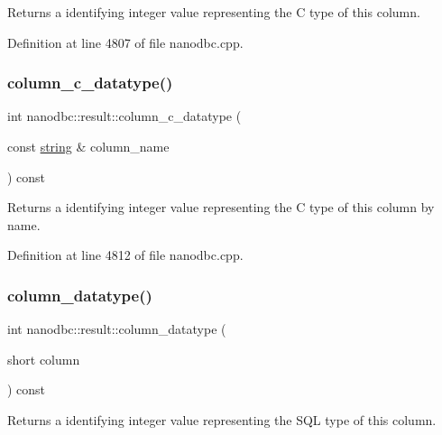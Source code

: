 Returns a identifying integer value representing the C type of this column. 



Definition at line 4807 of file nanodbc.\+cpp.

\mbox{\label{classnanodbc_1_1result_a3f505031acffabc538b2d840416074fa}} 
\subsubsection{\texorpdfstring{column\_c\_datatype()}{column\_c\_datatype()}\hspace{0.1cm}{\footnotesize\ttfamily [2/2]}}
{\footnotesize\ttfamily int nanodbc\+::result\+::column\+\_\+c\+\_\+datatype (\begin{DoxyParamCaption}\item[{const \mbox{\hyperlink{namespacenanodbc_abfc0ece56278e590911ec8352774c212}{string}} \&}]{column\+\_\+name }\end{DoxyParamCaption}) const}



Returns a identifying integer value representing the C type of this column by name. 



Definition at line 4812 of file nanodbc.\+cpp.

\mbox{\label{classnanodbc_1_1result_a8adc601a07a055f15908724e285133bb}} 
\subsubsection{\texorpdfstring{column\_datatype()}{column\_datatype()}\hspace{0.1cm}{\footnotesize\ttfamily [1/2]}}
{\footnotesize\ttfamily int nanodbc\+::result\+::column\+\_\+datatype (\begin{DoxyParamCaption}\item[{short}]{column }\end{DoxyParamCaption}) const}



Returns a identifying integer value representing the S\+QL type of this column. 



